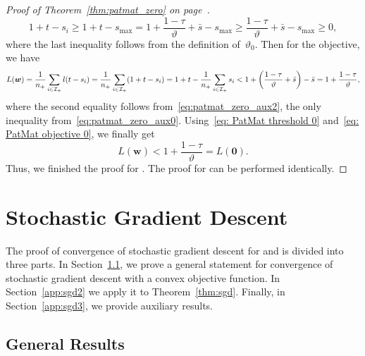 \begin{proof}[Proof of Theorem~\ref{thm:patmat_zero} on page~\pageref{thm:patmat_zero}]
  \begin{equation}\label{eq:patmat_zero_aux2}
    1 + t - s_i
    \geq 1 + t-s_{\max}
    =   1 + \frac{1-\tau}{\vartheta} + \bar{s} - s_{\max}
    \geq \frac{1-\tau}{\vartheta} + \bar{s} - s_{\max}
    \geq 0,
  \end{equation}
  where the last inequality follows from the definition of~$\vartheta_0$. Then for the objective, we have
  \begin{equation*}
    L(\bm{w})
      = \frac{1}{\npos}\sum_{i \in \Ipos}l(t-s_i)
      = \frac{1}{\npos}\sum_{i \in \Ipos}\Brac{1+t-s_i}
      = 1 + t - \frac{1}{\npos}\sum_{i \in \Ipos} s_i
      < 1 + \Brac{\frac{1 - \tau}{\vartheta} + \bar{s}} - \bar{s}
      = 1 + \frac{1-\tau}{\vartheta},  
  \end{equation*}
  where the second equality follows from~\eqref{eq:patmat_zero_aux2}, the only inequality from~\eqref{eq:patmat_zero_aux0}. Using~\eqref{eq: PatMat threshold 0} and~\eqref{eq: PatMat objective 0}, we finally get
  \begin{equation*}
    L(\bm{w})
      < 1 + \frac{1-\tau}{\vartheta}
      = L(\bm{0}).
  \end{equation*}
  Thus, we finished the proof for \PatMat. The proof for \PatMatNP can be performed identically.
\end{proof}

\section{Stochastic Gradient Descent}

The proof of convergence of stochastic gradient descent for \PatMat and \PatMatNP is divided into three parts. In Section~\ref{app:sgd1}, we prove a general statement for convergence of stochastic gradient descent with a convex objective function. In Section~\ref{app:sgd2} we apply it to Theorem~\ref{thm:sgd}. Finally, in Section~\ref{app:sgd3}, we provide auxiliary results.

\subsection{General Results}\label{app:sgd1}

